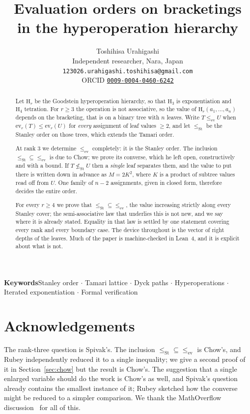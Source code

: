 \documentclass[11pt,a4paper]{article}
\title{Evaluation orders on bracketings\\ in the hyperoperation hierarchy}
\author{Toshihisa Urahigashi\\[2pt]
{\normalsize Independent researcher, Nara, Japan}\\[1pt]
{\normalsize\texttt{123026.urahigashi.toshihisa@gmail.com}}\\[1pt]
{\normalsize ORCID \href{https://orcid.org/0009-0004-0460-6242}{\texttt{0009-0004-0460-6242}}}}
\date{}
\theoremstyle{plain}
\theoremstyle{definition}
\newcommand{\HH}{\mathrm{H}}
\newcommand{\ev}{\mathrm{ev}}
\newcommand{\St}{\mathrm{St}}
\begin{document}
\maketitle

\begin{abstract}
Let $\HH_r$ be the Goodstein hyperoperation hierarchy, so that $\HH_3$ is
exponentiation and $\HH_4$ tetration. For $r\ge3$ the operation is not associative, so
the value of $\HH_r(a_1,\dots,a_n)$ depends on the bracketing, that is on a binary tree
with $n$ leaves. Write $T\le_{\ev}U$ when $\ev_r(T)\le\ev_r(U)$ for \emph{every}
assignment of leaf values $\ge2$, and let $\le_{\St}$ be the Stanley order on those
trees, which extends the Tamari order.

At rank $3$ we determine $\le_{\ev}$ completely: it is the Stanley order. The inclusion
$\le_{\St}\subseteq\le_{\ev}$ is due to Chow; we prove its converse, which he left open,
constructively and with a bound. If $T\not\le_{\St}U$ then a \emph{single} leaf separates
them, and the value to put there is written down in advance as $M=2K^{2}$, where $K$ is a
product of subtree values read off from $U$. One family of $n-2$ assignments, given in
closed form, therefore decides the entire order.

For every $r\ge4$ we prove that $\le_{\St}\subseteq\le_{\ev}$, the value increasing
strictly along every Stanley cover; the semi-associative law that underlies this is not
new, and we say where it is already stated. Equality in that law is settled by one
statement covering every rank and every boundary case. The device throughout is the
vector of right depths of the leaves. Much of the paper is machine-checked in Lean~4,
and it is explicit about what is not.
\end{abstract}

\medskip
\noindent\textbf{Keywords}\quad Stanley order $\cdot$ Tamari lattice $\cdot$ Dyck paths
$\cdot$ Hyperoperations $\cdot$ Iterated exponentiation $\cdot$ Formal verification

\section*{Acknowledgements}

The rank-three question is Spivak's. The inclusion $\le_{\St}\subseteq\le_{\ev}$ is
Chow's, and Rubey independently reduced it to a single inequality; we give a second
proof of it in Section~\ref{sec:chow} but the result is Chow's. The suggestion that a
single enlarged variable should do the work is Chow's as well, and Spivak's question
already contains the smallest instance of it; Rubey sketched how the converse might be
reduced to a simpler comparison. We thank the MathOverflow discussion~\cite{MO} for all
of this.
\end{document}
